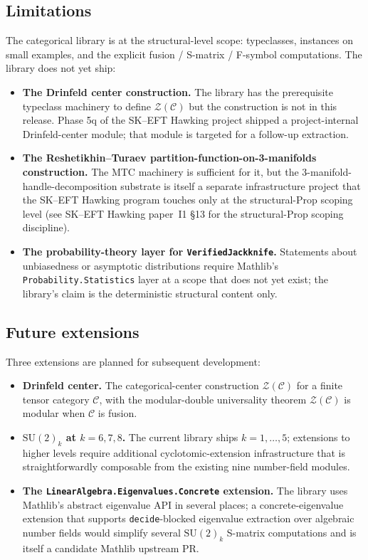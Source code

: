 \documentclass[11pt]{article}
\begin{document}
\subsection{Limitations}

The categorical library is at the structural-level scope:
typeclasses, instances on small examples, and the explicit fusion /
S-matrix / F-symbol computations. The library does not yet ship:

\begin{itemize}
\item \textbf{The Drinfeld center construction.} The library has
the prerequisite typeclass machinery to define
$\mathcal{Z}(\mathcal{C})$ but the construction is not in this
release. Phase 5q of the SK--EFT Hawking project shipped a
project-internal Drinfeld-center module; that module is targeted
for a follow-up extraction.
\item \textbf{The Reshetikhin--Turaev partition-function-on-3-manifolds
construction.} The MTC machinery is sufficient for it, but the
3-manifold-handle-decomposition substrate is itself a separate
infrastructure project that the SK--EFT Hawking program touches
only at the structural-Prop scoping level
(see SK--EFT Hawking paper~I1 §13 for the structural-Prop scoping
discipline).
\item \textbf{The probability-theory layer for
\texttt{VerifiedJackknife}.} Statements about unbiasedness or
asymptotic distributions require Mathlib's
\texttt{Probability.Statistics} layer at a scope that does not
yet exist; the library's claim is the deterministic structural
content only.
\end{itemize}

\subsection{Future extensions}

Three extensions are planned for subsequent development:

\begin{itemize}
\item \textbf{Drinfeld center.} The categorical-center construction
$\mathcal{Z}(\mathcal{C})$ for a finite tensor category
$\mathcal{C}$, with the modular-double universality theorem
$\mathcal{Z}(\mathcal{C})$ is modular when $\mathcal{C}$ is fusion.
\item \textbf{$\mathrm{SU}(2)_k$ at $k = 6, 7, 8$.} The current
library ships $k = 1, \ldots, 5$; extensions to higher levels
require additional cyclotomic-extension infrastructure that is
straightforwardly composable from the existing nine number-field
modules.
\item \textbf{The \texttt{LinearAlgebra.Eigenvalues.Concrete}
extension.} The library uses Mathlib's abstract eigenvalue API in
several places; a concrete-eigenvalue extension that supports
\texttt{decide}-blocked eigenvalue extraction over algebraic
number fields would simplify several
$\mathrm{SU}(2)_k$ S-matrix computations and is itself a
candidate Mathlib upstream PR.
\end{itemize}
\end{document}
